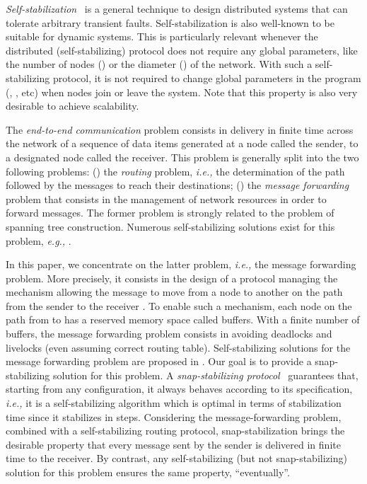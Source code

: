 \documentclass{llncs}
\newcommand{\eg}{\emph{e.g., }}
\newcommand{\ie}{\emph{i.e., }}
\begin{document}
{\em Self-stabilization}~\cite{D00} is a general technique to design distributed systems that 
can tolerate arbitrary transient faults.  Self-stabilization is also well-known to be suitable for dynamic systems. 
This is particularly relevant whenever the distributed (self-stabilizing) protocol does not require any global parameters,
like the number of nodes () or the diameter () of the network.  
With such a self-stabilizing protocol, it is not required to change 
global parameters in the program (, , etc) when nodes join or leave the system.  Note that this property 
is also very desirable to achieve scalability. 

The {\em end-to-end communication} problem consists in delivery in finite time across the network of a sequence of 
data items generated at a node called the sender, to a designated node called the receiver.
This problem is generally split into the two following problems:
() the {\em routing} problem, \ie the determination of the path followed by the messages to reach their destinations;
() the {\em message forwarding} problem that consists in the management of network resources in order to forward messages. 
The former problem is strongly related to the problem of spanning tree construction. Numerous self-stabilizing solutions exist for this problem, \eg \cite{HC92,KK05,JT03}. 

In this paper, we concentrate on the latter problem, \ie the message forwarding problem.   
More precisely, it consists in the design of a protocol managing the mechanism allowing
the message to move from a node to another on the path from the sender  to the receiver .
To enable such a mechanism, each node on the path from  to  has a reserved memory space called buffers.
With a finite number of buffers, the message forwarding problem consists in avoiding deadlocks and livelocks (even
assuming correct routing table).
Self-stabilizing solutions for the message forwarding problem are proposed in \cite{APV96,KOR95}. 
Our goal is to provide a snap-stabilizing solution for this problem.
A {\em snap-stabilizing protocol}~\cite{Bui07}
guarantees that, starting from any configuration, it always behaves
according to its specification, \ie it is a
self-stabilizing algorithm which is optimal in terms of stabilization
time since it stabilizes in  steps.
Considering the message-forwarding problem, combined with a self-stabilizing routing protocol, 
snap-stabilization brings the desirable property that 
every message sent by the sender is delivered in finite time to the receiver.
By contrast, any self-stabilizing (but not snap-stabilizing) solution for this problem
ensures the same property, ``eventually''. 
\end{document}
